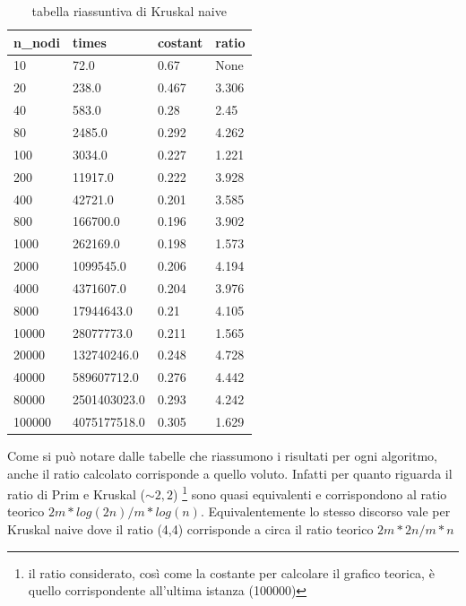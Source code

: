 \newpage
{}
\renewcommand{\arraystretch}{2}
\begin{longtable}[H]{|p{2cm}|p{3cm}|p{2cm}|p{3cm}|} 
    \rowcolor{white}
\multicolumn{4}{c}{Continua alla pagina seguente...}
\endfoot
\rowcolor{white}
\caption{tabella riassuntiva di Kruskal naive}
\label{tab:tabellaKriskalNaive}
\endlastfoot
\hline
    \rowcolor{lightgray}
    \textbf{n\_nodi} & \textbf{times} & \textbf{costant} & \textbf{ratio} \\ \hline\hline
    \endhead
    10	&	72.0		&	0.67	&	None \\ \hline
    20	&	238.0		&	0.467	&	3.306 \\ \hline
    40	&	583.0		&	0.28 &		2.45 \\ \hline
    80	&	2485.0		&	0.292 &		4.262 \\ \hline
    100	&	3034.0		&	0.227   &	1.221 \\ \hline
    200	&	11917.0		&	0.222	&	3.928 \\ \hline
    400	&	42721.0		&	0.201	&	3.585 \\ \hline
    800	&	166700.0	&	0.196	&   3.902 \\ \hline
    1000 &	262169.0	&	0.198	&   1.573 \\ \hline
    2000 &	1099545.0	&	0.206	&   4.194 \\ \hline
    4000 &	4371607.0	&	0.204 &		3.976 \\ \hline
    8000 &	17944643.0	&	0.21 &		4.105 \\ \hline
    10000 &	28077773.0	&	0.211 &		1.565 \\ \hline
    20000 &	132740246.0	&	0.248 &		4.728 \\ \hline
    40000 &	589607712.0	&	0.276 &		4.442 \\ \hline
    80000 &	2501403023.0 &	0.293 &		4.242 \\ \hline
    100000 &	4075177518.0 &	0.305 &		1.629 \\ \hline
\end{longtable}

Come si può notare dalle tabelle che riassumono i risultati per ogni algoritmo, anche il ratio calcolato corrisponde a quello voluto. Infatti per quanto riguarda il ratio di Prim e Kruskal ($\sim 2,2$) \footnote{il ratio considerato, così come la costante per calcolare il grafico teorica, è quello corrispondente all'ultima istanza (100000)} sono quasi equivalenti e corrispondono al ratio teorico $2m*log(2n) / m*log(n)$.
Equivalentemente lo stesso discorso vale per Kruskal naive dove il ratio (4,4) corrisponde a circa il ratio teorico $2m*2n/m*n$


